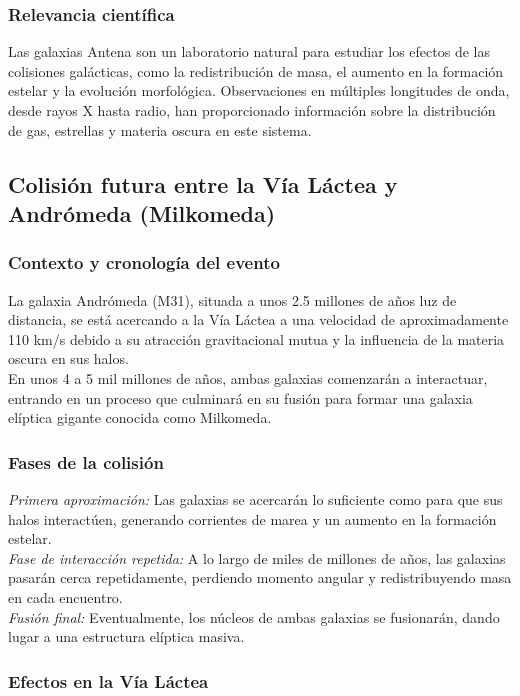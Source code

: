 \documentclass{article}
\begin{document}
\subsubsection*{Relevancia científica}

Las galaxias Antena son un laboratorio natural para estudiar los efectos de las colisiones galácticas, como la redistribución de masa, el aumento en la formación estelar y la evolución morfológica. Observaciones en múltiples longitudes de onda, desde rayos X hasta radio, han proporcionado información sobre la distribución de gas, estrellas y materia oscura en este sistema.
\subsection{Colisión futura entre la Vía Láctea y Andrómeda (Milkomeda)}
\subsubsection*{Contexto y cronología del evento}

La galaxia Andrómeda (M31), situada a unos 2.5 millones de años luz de distancia, se está acercando a la Vía Láctea a una velocidad de aproximadamente 110 km/s debido a su atracción gravitacional mutua y la influencia de la materia oscura en sus halos. \\
En unos 4 a 5 mil millones de años, ambas galaxias comenzarán a interactuar, entrando en un proceso que culminará en su fusión para formar una galaxia elíptica gigante conocida como Milkomeda.
\subsubsection*{Fases de la colisión}

\textit{Primera aproximación:} Las galaxias se acercarán lo suficiente como para que sus halos interactúen, generando corrientes de marea y un aumento en la formación estelar. \\
\textit{Fase de interacción repetida:} A lo largo de miles de millones de años, las galaxias pasarán cerca repetidamente, perdiendo momento angular y redistribuyendo masa en cada encuentro. \\
\textit{Fusión final:} Eventualmente, los núcleos de ambas galaxias se fusionarán, dando lugar a una estructura elíptica masiva.
\subsubsection*{Efectos en la Vía Láctea}
\end{document}

